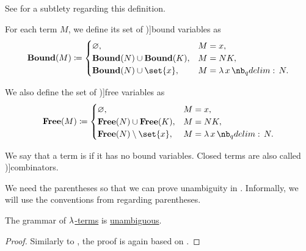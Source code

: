 \begin{definition}
\begin{thmenum}
    See  for a subtlety regarding this definition.

     For each term \( M \), we define its set of \term[ru=связанные (переменные) (\cite[188]{Герасимов2011})]{bound variables} as
    \begin{equation*}
      \boldop{Bound}(M) \coloneqq \begin{cases}
        \varnothing,                              &M = x, \\
        \boldop{Bound}(N) \cup \boldop{Bound}(K), &M = N K, \\
        \boldop{Bound}(N) \cup \set{ x },         &M = \qabs x N. \\
      \end{cases}
    \end{equation*}

     We also define the set of \term[ru=свободные (переменные) (\cite[189]{Герасимов2011})]{free variables} as
    \begin{equation*}
      \boldop{Free}(M) \coloneqq \begin{cases}
        \varnothing,                            &M = x, \\
        \boldop{Free}(N) \cup \boldop{Free}(K), &M = N K, \\
        \boldop{Free}(N) \setminus \set{ x },   &M = \qabs x N. \\
      \end{cases}
    \end{equation*}

     We say that a term is  if it has no bound variables. Closed terms are also called \term[ru=комбинаторы (\cite[188]{Герасимов2011})]{combinators}.
  \end{thmenum}
\end{definition}
\begin{comments}
  \item We need the parentheses so that we can prove unambiguity in . Informally, we will use the conventions from  regarding parentheses.
\end{comments}

\begin{proposition}\label{thm:lambda_terms_are_unambiguous}
  The grammar of \hyperref[def:lambda_term]{\( \mathrm{\lambda} \)-terms} is \hyperref[def:grammar_ambiguity]{unambiguous}.
\end{proposition}
\begin{proof}
  Similarly to , the proof is again based on .
\end{proof}

